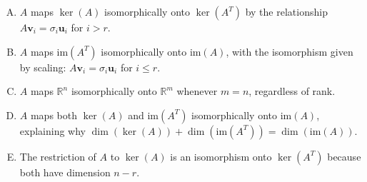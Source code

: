\documentclass[12pt]{amsart}
\begin{document}
\begin{enumerate}[(A)]
\item $A$ maps $\ker(A)$ isomorphically onto $\ker(A^T)$ by the relationship $A\mathbf{v}_i = \sigma_i \mathbf{u}_i$ for $i > r$.
\item $A$ maps $\text{im}(A^T)$ isomorphically onto $\text{im}(A)$, with the isomorphism given by scaling: $A\mathbf{v}_i = \sigma_i \mathbf{u}_i$ for $i \leq r$.
\item $A$ maps $\mathbb{R}^n$ isomorphically onto $\mathbb{R}^m$ whenever $m = n$, regardless of rank.
\item $A$ maps both $\ker(A)$ and $\text{im}(A^T)$ isomorphically onto $\text{im}(A)$, explaining why $\dim(\ker(A)) + \dim(\text{im}(A^T)) = \dim(\text{im}(A))$.
\item The restriction of $A$ to $\ker(A)$ is an isomorphism onto $\ker(A^T)$ because both have dimension $n - r$.
\end{enumerate}

\end{document}
